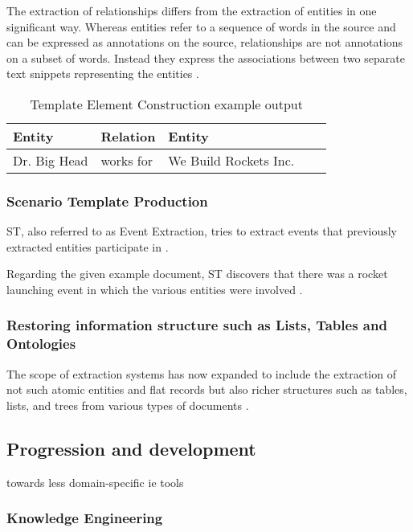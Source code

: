 The extraction of relationships differs from the extraction of entities in one significant way. Whereas entities refer to a sequence of words in the source and can be expressed as annotations on the source, relationships are not annotations on a subset of words. Instead they express the associations between two separate text snippets representing the entities \cite{Sarawagi:2008}.

\begin{table}[H]
\centering
\begin{tabular*}{\textwidth}{ l l l l l }
	\toprule
	\textbf{Entity} & \textbf{Relation}  & \textbf{Entity} \\
	\midrule
	Dr. Big Head & works for & We Build Rockets Inc. \\
	\bottomrule
\end{tabular*}
\caption{Template Element Construction example output}
\end{table}

\newpage
\subsubsection{Scenario Template Production}
\gls{ST}, also referred to as Event Extraction, tries to extract events that previously extracted entities participate in \cite{Cunningham:2005}.

Regarding the given example document, \gls{ST} discovers that there was a rocket launching event in which the various entities were involved \cite{Cunningham:2005}.

\subsubsection{Restoring information structure such as Lists, Tables and Ontologies}
The scope of extraction systems has now expanded to include the extraction of not such atomic entities and flat records but also richer structures such as tables, lists, and trees from various types of documents \cite{Sarawagi:2008}.

\newpage
\subsection{Progression and development}
towards less domain-specific ie tools

\subsubsection{Knowledge Engineering}

